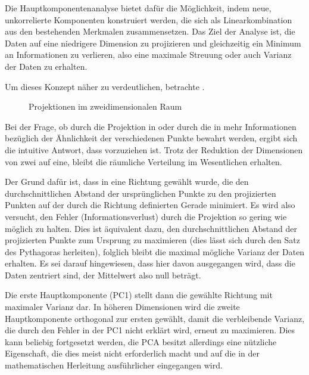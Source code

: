 Die Hauptkomponentenanalyse bietet dafür die Möglichkeit, indem neue, unkorrelierte Komponenten konstruiert werden, die sich als Linearkombination aus den bestehenden Merkmalen zusammensetzen.
Das Ziel der Analyse ist, die Daten auf eine niedrigere Dimension zu projizieren und gleichzeitig ein Minimum an Informationen zu verlieren, also eine maximale Streuung oder auch Varianz der Daten zu erhalten.

Um dieses Konzept näher zu verdeutlichen, betrachte .
\begin{figure}[bt]
    \centering
    \begin{subfigure}{\textwidth}
        \centering
        \caption{}\label{fig:pca2d1}
        
        \hspace{20pt}
        
    \end{subfigure}
    \begin{subfigure}{\textwidth}
        \centering
        \caption{}\label{fig:pca2d2}
        
        \hspace{20pt}
        
    \end{subfigure}
    \caption{Projektionen im zweidimensionalen Raum}\label{fig:pca2d}
\end{figure}
Bei der Frage, ob durch die Projektion in  oder durch die in  mehr Informationen bezüglich der Ähnlichkeit der verschiedenen Punkte bewahrt werden, ergibt sich die intuitive Antwort, dass  vorzuziehen ist.
Trotz der Reduktion der Dimensionen von zwei auf eine, bleibt die räumliche Verteilung im Wesentlichen erhalten.

Der Grund dafür ist, dass in  eine Richtung gewählt wurde, die den durchschnittlichen Abstand der ursprünglichen Punkte zu den projizierten Punkten auf der durch die Richtung definierten Gerade minimiert.
Es wird also versucht, den Fehler (Informationsverlust) durch die Projektion so gering wie möglich zu halten.
Dies ist äquivalent dazu, den durchschnittlichen Abstand der projizierten Punkte zum Ursprung zu maximieren (dies lässt sich durch den Satz des Pythagoras herleiten), folglich bleibt die maximal mögliche Varianz der Daten erhalten.
Es sei darauf hingewiesen, dass hier davon ausgegangen wird, dass die Daten zentriert sind, der Mittelwert also null beträgt.

Die erste Hauptkomponente (PC1) stellt dann die gewählte Richtung mit maximaler Varianz dar.
In höheren Dimensionen wird die zweite Hauptkomponente orthogonal zur ersten gewählt, damit die verbleibende Varianz, die durch den Fehler in der PC1 nicht erklärt wird, erneut zu maximieren.
Dies kann beliebig fortgesetzt werden, die PCA besitzt allerdings eine nützliche Eigenschaft, die dies meist nicht erforderlich macht und auf die in der mathematischen Herleitung ausführlicher eingegangen wird.

